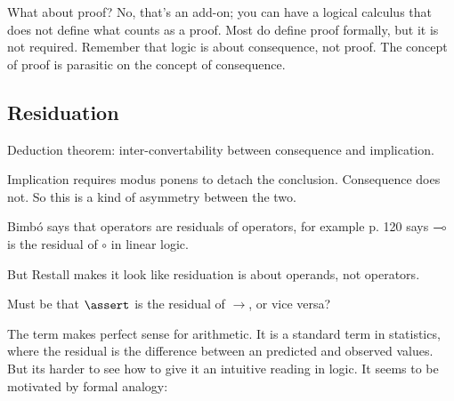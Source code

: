 \documentclass{article}
\begin{document}
What about proof? No, that's an add-on; you can have a logical
calculus that does not define what counts as a proof. Most do define
proof formally, but it is not required. Remember that logic is about
consequence, not proof. The concept of proof is parasitic on the
concept of consequence.


\subsection{Residuation}

Deduction theorem: inter-convertability between consequence and
implication.

Implication requires modus ponens to detach the conclusion.
Consequence does not. So this is a kind of asymmetry between the two.


Bimbó says that operators are residuals of operators, for example
p. 120 says \(\multimap\) is the residual of \(\circ\) in linear
logic.

But Restall makes it look like residuation is about operands, not
operators.

Must be that \(\linfer\) is the residual of \(→\), or vice versa?



The term makes perfect sense for arithmetic. It is a standard term in
statistics, where the residual is the difference between an predicted
and observed values. But its harder to see how to give it an intuitive
reading in logic. It seems to be motivated by formal analogy:
\end{document}
